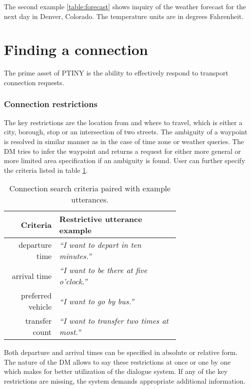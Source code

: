 The second example \ref{table:forecast} shows inquiry of the weather forecast for the next day in Denver, Colorado.
The temperature units are in degrees Fahrenheit.

\section{Finding a connection}

The prime asset of \ac{PTINY} is the ability to effectively respond to transport connection requests.

\subsubsection{Connection restrictions}

The key restrictions are the location from and where to travel, which is either a city, borough, stop or an intersection of two streets.
The ambiguity of a waypoint is resolved in similar manner as in the case of time zone or weather queries.
The \ac{DM} tries to infer the waypoint and returns a request for either more general or more limited area specification if an ambiguity is found.
User can further specify the criteria listed in table \ref{table:criteria}.

\begin{table}[h]
\centering
\begin{tabular}{ r | p{0.7\linewidth} }
	\textbf{Criteria} & \textbf{Restrictive utterance example} \\ \hline
	departure time & \textit{``I want to depart in ten minutes.''} \\
	arrival time & \textit{``I want to be there at five o'clock.''} \\
	preferred vehicle & \textit{``I want to go by bus.''} \\
	transfer count & \textit{``I want to transfer two times at most.''}
\end{tabular}
\caption[Restrictive criteria specification]{Connection search criteria paired with example utterances.}
\label{table:criteria}
\end{table}

Both departure and arrival times can be specified in absolute or relative form.
The nature of the \ac{DM} allows to say these restrictions at once or one by one which makes for better utilization of the dialogue system.
If any of the key restrictions are missing, the system demands appropriate additional information.

